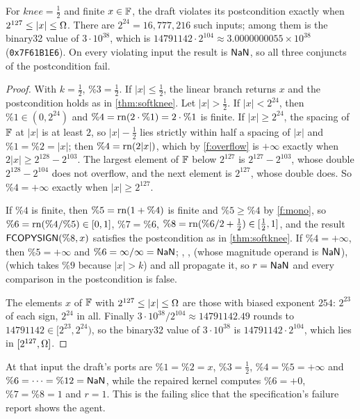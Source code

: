 \begin{proposition}\label{prop:draft}
For $\mathit{knee}=\frac12$ and finite $x\in\mathbb{F}$, the draft violates its postcondition exactly
when $2^{127}\le|x|\le\Omega$. There are $2^{24}=16{,}777{,}216$ such inputs; among them is the
binary32 value of $3\cdot10^{38}$, which is $14791142\cdot2^{104}\approx3.0000000055\times10^{38}$
(\texttt{0x7F61B1E6}). On every violating input the result is $\mathsf{NaN}$, so all three conjuncts of
the postcondition fail.
\end{proposition}
\begin{proof}
With $k=\frac12$, $\%3=\frac12$. If $|x|\le\frac12$, the linear branch returns $x$ and the
postcondition holds as in \cref{thm:softknee}. Let $|x|>\frac12$. If $|x|<2^{24}$, then
$\%1\in(0,2^{24})$ and $\%4=\mathrm{rn}(2\cdot\%1)=2\cdot\%1$ is finite. If $|x|\ge2^{24}$, the spacing of
$\mathbb{F}$ at $|x|$ is at least $2$, so $|x|-\frac12$ lies strictly within half a spacing of $|x|$ and
$\%1=\%2=|x|$; then $\%4=\mathrm{rn}(2|x|)$, which by \ref{f:overflow} is $+\infty$ exactly when
$2|x|\ge2^{128}-2^{103}$. The largest element of $\mathbb{F}$ below $2^{127}$ is $2^{127}-2^{103}$,
whose double $2^{128}-2^{104}$ does not overflow, and the next element is $2^{127}$, whose double
does. So $\%4=+\infty$ exactly when $|x|\ge2^{127}$.

If $\%4$ is finite, then $\%5=\mathrm{rn}(1+\%4)$ is finite and $\%5\ge\%4$ by \ref{f:mono}, so
$\%6=\mathrm{rn}(\%4/\%5)\in[0,1]$, $\%7=\%6$, $\%8=\mathrm{rn}(\%6/2+\frac12)\in[\frac12,1]$, and the result
$\mbox{\textsf{FCOPYSIGN}}(\%8,x)$ satisfies the postcondition as in \cref{thm:softknee}. If
$\%4=+\infty$, then $\%5=+\infty$ and $\%6=\infty/\infty=\mathsf{NaN}$; , ,
 (whose magnitude operand is $\mathsf{NaN}$),  (which takes $\%9$ because
$|x|>k$) and  all propagate it, so $r=\mathsf{NaN}$ and every comparison in the postcondition
is false.

The elements $x$ of $\mathbb{F}$ with $2^{127}\le|x|\le\Omega$ are those with biased exponent $254$:
$2^{23}$ of each sign, $2^{24}$ in all. Finally $3\cdot10^{38}/2^{104}\approx14791142.49$ rounds to
$14791142\in[2^{23},2^{24})$, so the binary32 value of $3\cdot10^{38}$ is $14791142\cdot2^{104}$,
which lies in $[2^{127},\Omega]$.
\end{proof}

At that input the draft's ports are $\%1=\%2=x$, $\%3=\frac12$, $\%4=\%5=+\infty$ and
$\%6=\dots=\%12=\mathsf{NaN}$, while the repaired kernel computes $\%6=+0$, $\%7=\%8=1$ and $r=1$. This
is the failing slice that the specification's failure report shows the agent.

